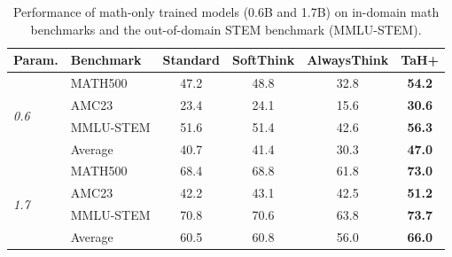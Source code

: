 



\begin{table}[tb]
    \centering
    \caption{Performance of math-only trained models (0.6B and 1.7B) on in-domain math benchmarks and the out-of-domain STEM benchmark (MMLU-STEM).}
    \label{tab:math_1.7_peformance}
    \setlength{\tabcolsep}{4pt}
    \begin{tabular}{ll|cccc}
    \toprule
    \textbf{Param.} & \textbf{Benchmark} & \textbf{Standard} & \textbf{SoftThink} & \textbf{AlwaysThink} & \textbf{TaH+} \\
    \midrule
    \multirow{4}{*}{\textit{0.6}} 
        & MATH500    & 47.2 & 48.8 & 32.8 & \textbf{54.2} \\
        & AMC23      & 23.4 & 24.1 & 15.6 & \textbf{30.6} \\
        & MMLU-STEM  & 51.6 & 51.4 & 42.6 & \textbf{56.3} \\
        \cmidrule(lr){2-6}
        & Average    & 40.7 & 41.4 & 30.3 & \textbf{47.0} \\
    \midrule
    \multirow{4}{*}{\textit{1.7}} 
        & MATH500    & 68.4 & 68.8 & 61.8 & \textbf{73.0} \\
        & AMC23      & 42.2 & 43.1 & 42.5 & \textbf{51.2} \\
        & MMLU-STEM  & 70.8 & 70.6 & 63.8 & \textbf{73.7} \\
        \cmidrule(lr){2-6}
        & Average    & 60.5 & 60.8 & 56.0 & \textbf{66.0} \\
    \bottomrule
    \end{tabular}
\end{table}


